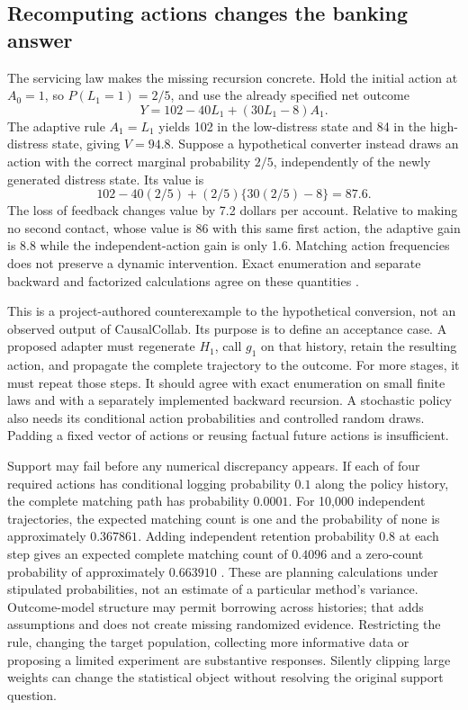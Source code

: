 \subsection{Recomputing actions changes the banking answer}

The servicing law makes the missing recursion concrete. Hold the initial
action at $A_0=1$, so $P(L_1=1)=2/5$, and use the already specified
net outcome
\[
 Y=102-40L_1+(30L_1-8)A_1.
\]
The adaptive rule $A_1=L_1$ yields 102 in the low-distress state and 84
in the high-distress state, giving $V=94.8$.
Suppose a hypothetical converter instead draws an action with the correct
marginal probability $2/5$, independently of the newly generated distress
state. Its value is
\[
 102-40(2/5)+(2/5)\{30(2/5)-8\}=87.6.
\]
The loss of feedback changes value by 7.2 dollars per account.
Relative to making no second contact, whose value is 86 with this same
first action, the adaptive gain is 8.8 while the independent-action gain
is only 1.6. Matching action frequencies does not preserve a dynamic
intervention. Exact enumeration and separate backward and factorized
calculations agree on these quantities
\citep{exec16_longpolicy_oracle}.

This is a project-authored counterexample to the hypothetical conversion,
not an observed output of CausalCollab. Its purpose is to define an
acceptance case. A proposed adapter must regenerate $H_1$, call $g_1$
on that history, retain the resulting action, and propagate the complete
trajectory to the outcome. For more stages, it must repeat those steps.
It should agree with exact enumeration on small finite laws and with a
separately implemented backward recursion. A stochastic policy also needs
its conditional action probabilities and controlled random draws.
Padding a fixed vector of actions or reusing factual future actions is
insufficient.

Support may fail before any numerical discrepancy appears. If each of
four required actions has conditional logging probability $0.1$ along
the policy history, the complete matching path has probability $0.0001$.
For 10,000 independent trajectories, the expected matching count is one
and the probability of none is approximately $0.367861$.
Adding independent retention probability $0.8$ at each step gives an
expected complete matching count of $0.4096$ and a zero-count probability
of approximately $0.663910$
\citep{exec16_longpolicy_oracle}. These are planning calculations under
stipulated probabilities, not an estimate of a particular method's
variance. Outcome-model structure may permit borrowing across histories;
that adds assumptions and does not create missing randomized evidence.
Restricting the rule, changing the target population, collecting more
informative data or proposing a limited experiment are substantive
responses. Silently clipping large weights can change the statistical
object without resolving the original support question.

